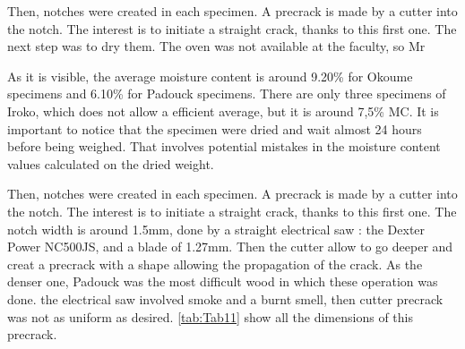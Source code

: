 Then, notches were created in each specimen. A precrack is made by a cutter into the notch. The interest is to initiate a straight crack, thanks to this first one.
The next step was to dry them. The oven was not available at the faculty, so Mr

As it is visible, the average moisture content is around 9.20\% for Okoume specimens and 6.10\% for Padouck specimens. There are only three specimens of Iroko, which does not allow a efficient average, but it is around 7,5\% MC. It is important to notice that the specimen were dried and wait almost 24 hours before being weighed. That involves potential mistakes in the moisture content values calculated on the dried weight.

Then, notches were created in each specimen. A precrack is made by a cutter into the notch. The interest is to initiate a straight crack, thanks to this first one. The notch width is around 1.5mm, done by a straight electrical saw : the Dexter Power NC500JS, and a blade of 1.27mm. Then the cutter allow to go deeper and creat a precrack with a shape allowing the propagation of the crack. As the denser one, Padouck was the most difficult wood in which these operation was done. the electrical saw involved smoke and a burnt smell, then cutter precrack was not as uniform as desired. \ref{tab:Tab11} show all the dimensions of this precrack.

